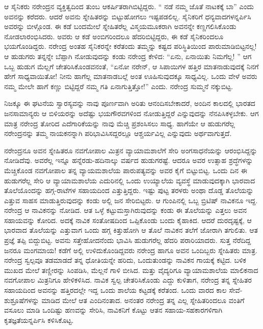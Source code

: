 ಆ ಸೈನಿಕರು ನರೇಂದ್ರನ ವ್ಯಕ್ತಿತ್ವದಿಂದ ತುಂಬ ಆಕರ್ಷಿತರಾಗಿಬಿಟ್ಟಿದ್ದರು. “ ನಡೆ ನಮ್ಮ ಜೊತೆ ನಾಟಕಕ್ಕೆ ಬಾ” ಎಂದು ಅವನನ್ನು ಕರೆದರು. ಆದರೆ ಅವನು ಸ್ನೇಹಿತರನ್ನು ಬಿಟ್ಟುಹೋಗಲು ಇಷ್ಟಪಡಲಿಲ್ಲ. ಸೈನಿಕರಿಗೆ ಧನ್ಯವಾದಗಳನ್ನರ್ಪಿಸಿ ಅವರನ್ನು ಬೀಳ್ಗೊಂಡ. ಈ ಕಡೆ ಬಂದಮೇಲೆ ಸ್ನೇಹಿತರೆಲ್ಲ ವಿಸ್ಮಯಮೂಕರಾಗಿ ಅವನನ್ನೇ ಕಣ್ಣಗಲಿಸಿಕೊಂಡು ನೋಡಲಾರಂಭಿಸಿದರು. ಅವರು ಆ ಕಡೆ ಅಂಬಿಗರಿಂದಲೂ ಹೆದರಿಬಿಟ್ಟಿದ್ದರು, ಈ ಕಡೆ ಸೈನಿಕರಿಂದಲೂ ಭಯಗೊಂಡಿದ್ದರು. ನರೇಂದ್ರ ಅಂತಹ ಸೈನಿಕರನ್ನೇ ಕರೆತಂದು ತಮ್ಮನ್ನು ಕಷ್ಟದ ಪರಿಸ್ಥಿತಿಯಿಂದ ಪಾರುಮಾಡಿಬಿಟ್ಟನಲ್ಲ! ಆ ಹುಡುಗರು ತನ್ನನ್ನೇ ಬೆಪ್ಪಾಗಿ ನೋಡುವುದನ್ನು ಕಂಡು ನರೇಂದ್ರ ಕೇಳಿದ: “ಏನು, ಏನಾಯಿತು ನಿಮಗೆಲ್ಲ! ” ಆಗ ಒಬ್ಬ ಹುಡುಗ ಮೆಲ್ಲಗೆ ಚೇತರಿಸಿಕೊಂಡವನಂತೆ, “ಏನೋ ನರೇನ್, ಆ ಸಿಪಾಯಿಗಳ ಹತ್ತಿರ ಮಾತನಾಡುವುದಕ್ಕೆ ನಿನಗೆ ಹೇಗೆ ಸಾಧ್ಯವಾಯಿತೋ! ನೀನು ಹಾಗೆಲ್ಲ ಮಾತನಾಡಬಲ್ಲೆ ಅಂತ ಊಹಿಸುವುದಕ್ಕೂ ಸಾಧ್ಯವಿಲ್ಲ. ಒಂದು ವೇಳೆ ಅವರು ನಮ್ಮ ಮೇಲೇ ಹಾಗೆ ಕಣ್ಣು ಬಿಟ್ಟಿದ್ದರೆ ನಮ್ಮ ಗತಿ ಏನಾಗುತ್ತಿತ್ತೋ!” ಎಂದು. ನರೇಂದ್ರ ಸುಮ್ಮನೆ ನಕ್ಕುಬಿಟ್ಟ.

ನಿಜಕ್ಕೂ ಈ ಘಟನೆಯ ಸ್ವಾರಸ್ಯವನ್ನು ನಾವು ಪೂರ್ಣವಾಗಿ ಅರಿತು ಆನಂದಿಸಬೇಕಾದರೆ, ಅಂದಿನ ಕಾಲದಲ್ಲಿ ಭಾರತದ ಜನಸಾಮಾನ್ಯರು ಆ ಬಿಳಿಯರನ್ನು ಅದೆಷ್ಟು ಭಯಗೌರವಗಳಿಂದ ನೋಡುತ್ತಿದ್ದರೆ ಎನ್ನುವುದನ್ನು ನೆನಪಿಸಿಕಳ್ಳಬೇಕು. ಆಗ ಮಾತ್ರ ನರೇಂದ್ರ ತೋರಿದ ಎದೆಗಾರಿಕೆಯನ್ನು ನಾವು ಮೆಚ್ಚಿ ಪ್ರಶಂಸಿಸಲು ಸಾಧ್ಯ. ಹಾಗೆಯೇ ಆ ಹುಡುಗರೆಲ್ಲ ನರೇಂದ್ರನನ್ನು ತಮ್ಮ ನಾಯಕನನ್ನಾಗಿ ಪರಿಭಾವಿಸಿಸದ್ದರಲ್ಲೂ ಆಶ್ಚರ್ಯವಿಲ್ಲ ಎನ್ನುವುದು ಅರ್ಥವಾಗುತ್ತದೆ.

ನರೇಂದ್ರನೂ ಅವನ ಸ್ನೇಹಿತರೂ ನವಗೋಪಾಲ ಮಿತ್ರನ ವ್ಯಾಯಾಮಶಾಲೆಗೆ ಸೇರಿ ಅಂಗಸಾಧನೆಯನ್ನು ಆರಂಭಿಸಿದ್ದನ್ನು ನೋಡಿದೆವು. ಅವರೆಲ್ಲ ಇನ್ನೂ ಹನ್ನೆರಡು-ಹದಿನಾಲ್ಕು ವರ್ಷದ ಹುಡುಗರಷ್ಟೆ. ಆದರೂ ಅವರ ಉತ್ಸಾಹ ಶ್ರದ್ಧೆಗಳನ್ನು ಮೆಚ್ಚಿಕೊಂಡ ನವಗೋಪಾಲ ತನ್ನ ವ್ಯಾಯಮಶಾಲೆಯ ಪಾರುಪತ್ಯವನ್ನು ಅವರ ಕೈಗೆ ಬಿಟ್ಟುಬಿಟ್ಟ. ಒಂದು ದಿನ ಈ ಹುಡುಗರೆಲ್ಲ ಸೇರಿ ಆ ವ್ಯಾಯಾಮಶಾಲೆಯ ಎದುರಿನಲ್ಲಿ ಒಂದು ಉಯ್ಯಾಲೆಯ ವ್ಯವಸ್ಥೆ ಮಾಡುವುದಕ್ಕಾಗಿ ಭಾರವಾದ ತೊಲೆಯೊಂದನ್ನು ಹಗ್ಗ-ರಾಟೆಗಳ ಸಹಾಯದಿಂದ ಎತ್ತುತ್ತಿದ್ದರು. ಇಷ್ಟು ಪುಟ್ಟ ತರಳರು ಅಂಥಾ ದೊಡ್ಡ ತೊಲೆಯನ್ನು ಎತ್ತುವ ಸಾಹಸ ಮಾಡುತ್ತಿರುವುದನ್ನು ಕಂಡು ಅಲ್ಲಿ ಜನ ಸೇರಿಬಿಟ್ಟರು. ಆ ಗುಂಪಿನಲ್ಲಿ ಒಬ್ಬ ಬ್ರಿಟಿಷ್ ನಾವಿಕನೂ ಇದ್ದ. ನರೇಂದ್ರ ಆ ನಾವಿಕನನ್ನು ನೋಡಿದ. ಆತ ಒಳ್ಳೆ ಕಟ್ಟುಮಸ್ತಾಗಿರುವುದನ್ನು ಕಂಡು ಈ ತೊಲೆಯನ್ನು ಎತ್ತಲು ಅವನ ಸಹಾಯವನ್ನು ಕೋರಿದ. ಅದಕ್ಕೆ ನಾವಿಕ ಸಂತೋಷದಿಂದ ಒಪ್ಪಿಕೊಂಡು ಬಂದು ಕೈಹಾಕಿದ. ಆದರೆ ದುರದೃಷ್ಟಕ್ಕೆ, ಆ ಭಾರವಾದ ತೊಲೆಯನ್ನು ಎತ್ತುವಾಗ ಒಂದು ಹಗ್ಗ ಕಿತ್ತುಹೋಗಿ ಆ ತೊಲೆ ನಾವಿಕನ ತಲೆಗೆ ಜೋರಾಗಿ ತಗುಲಿತು. ಆತ ಪ್ರಜ್ಞೆ ತಪ್ಪಿ ಬಿದ್ದುಬಿಟ್ಟ. ಅವನು ಸತ್ತೇಹೋದನೆಂದು ಭಾವಿಸಿ ಹುಡುಗರೆಲ್ಲ ಹೆದರಿ ಪರಾರಿಯಾದರು. ಸುತ್ತ ನೆರೆದಿದ್ದ ಜನರೂ ಮಂಗಮಾಯ! ಕಡೆಗೆ ಅಲ್ಲಿ ಉಳಿದುಕೊಂಡಿದ್ದವರು ನರೇಂದ್ರ ಹಾಗೂ ಅವನ ಒಂದಿಬ್ಬರು ಸ್ನೇಹಿತರು ಮಾತ್ರ. ನರೇಂದ್ರ ಸ್ವಲ್ಪವೂ ತಡಮಾಡದೆ ತನ್ನ ಧೋತಿಯನ್ನೇ ಹರಿದು, ಒಂದುತುಂಡನ್ನು ನಾವಿಕನ ಗಾಯಕ್ಕೆ ಕಟ್ಟಿದ. ಬಳಿಕ ಮುಖದ ಮೇಲೆ ತಣ್ಣೀರನ್ನು ಸಿಂಪಡಿಸಿ, ಮೆಲ್ಲನೆ ಗಾಳಿ ಬೀಸಿದ. ಮತ್ತು ವೈದ್ಯರಿಗೂ ವ್ಯಾಯಾಮಶಾಲೆಯ ಮಾಲಿಕನಾದ ನವಗೋಪಾಲ ಮಿತ್ರನಿಗೂ ಹೇಳಿಕಳಿಸಿದ. ನಾವಿಕ ಸ್ವಲ್ಪ ಚೇತರಿಸಿಕೊಂಡು ಎದ್ದು ಕುಳಿತಾಗ, ನರೇಂದ್ರ ತನ್ನ ಸ್ನೇಹಿತರ ಸಹಾಯದಿಂದ ಅವನನ್ನು ಹತ್ತಿರದಲ್ಲೇ ಇದ್ದ ಒಂದು ಶಾಲೆಯ ಕಟ್ಟಡಕ್ಕೆ ಕರೆತಂದ. ಒಂದು ವಾರದ ಕಾಲ ಸೇವೆ-ಶುಶ್ರೂಷೆಗಳನ್ನು ಮಾಡಿದ ಮೇಲೆ ಆತ ಎಂದಿನಂತಾದ. ಅನಂತರ ನರೇಂದ್ರ ತನ್ನ ಎಲ್ಲ ಸ್ನೇಹಿತರಿಂದಲೂ ವಂತಿಗೆ ವಸೂಲು ಮಾಡಿ ಒಂದಿಷ್ಟು ಹಣವನ್ನು ಸೇರಿಸಿ, ನಾವಿಕನಿಗೆ ಕೊಟ್ಟು ಆತನ ಸಹಾಯ-ಸಹಕಾರಗಳಿಗಾಗಿ ಕೃತಜ್ಞತೆಯನ್ನರ್ಪಿಸಿ ಕಳಿಸಿಕೊಟ್ಟ.


